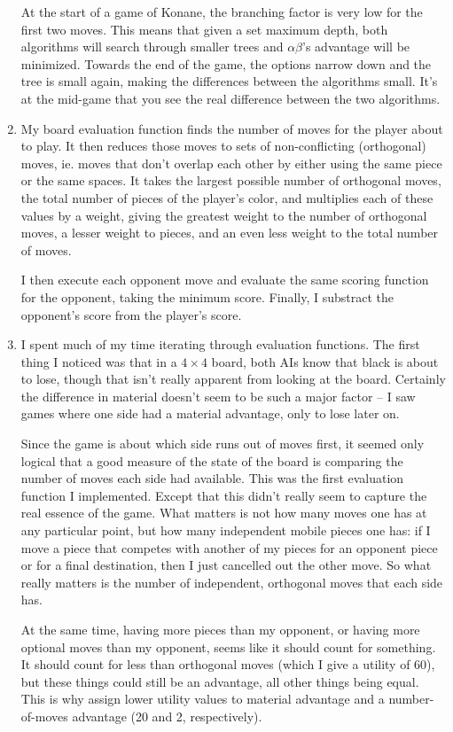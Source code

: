 \documentclass[12pt]{article}
\begin{document}
\begin{enumerate}
	At the start of a game of Konane, the branching factor is very low for the first two moves. This means that given a set maximum depth, both algorithms will search through smaller trees and $\alpha\beta$'s advantage will be minimized. Towards the end of the game, the options narrow down and the tree is small again, making the differences between the algorithms small. It's at the mid-game that you see the real difference between the two algorithms.

\item My board evaluation function finds the number of moves for the player about to play. It then reduces those moves to sets of non-conflicting (orthogonal) moves, ie. moves that don't overlap each other by either using the same piece or the same spaces. It takes the largest possible number of orthogonal moves, the total number of pieces of the player's color, and multiplies each of these values by a weight, giving the greatest weight to the number of orthogonal moves, a lesser weight to pieces, and an even less weight to the total number of moves.

	I then execute each opponent move and evaluate the same scoring function for the opponent, taking the minimum score. Finally, I substract the opponent's score from the player's score.

\item I spent much of my time iterating through evaluation functions. The first thing I noticed was that in a $4\times4$ board, both AIs know that black is about to lose, though that isn't really apparent from looking at the board. Certainly the difference in material doesn't seem to be such a major factor -- I saw games where one side had a material advantage, only to lose later on. 

	Since the game is about which side runs out of moves first, it seemed only logical that a good measure of the state of the board is comparing the number of moves each side had available. This was the first evaluation function I implemented. Except that this didn't really seem to capture the real essence of the game. What matters is not how many moves one has at any particular point, but how many independent mobile pieces one has: if I move a piece that competes with another of my pieces for an opponent piece or for a final destination, then I just cancelled out the other move. So what really matters is the number of independent, orthogonal moves that each side has.

	At the same time, having more pieces than my opponent, or having more optional moves than my opponent, seems like it should count for something. It should count for less than orthogonal moves (which I give a utility of 60), but these things could still be an advantage, all other things being equal. This is why assign lower utility values to material advantage and a number-of-moves advantage (20 and 2, respectively). 


\end{enumerate}
\end{document}
